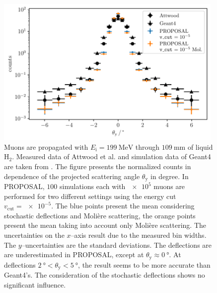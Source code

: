 \documentclass[pdflatex, sn-mathphys]{sn-jnl}%
\theoremstyle{thmstyleone}%
\theoremstyle{thmstyletwo}%
\theoremstyle{thmstylethree}%
\begin{document}
\begin{figure}
    \centering 
    \includegraphics[width=0.98\textwidth]{../../deflection/plots/FINAL/attwood_comparison_moliere_199MeV_final_multi_mean_deg.pdf}
    \caption{
    Muons are 
    propagated with $E_{\mathrm{i}} = \SI{199}{\mega\electronvolt}$ through 
    $\SI{109}{\milli\meter}$ of liquid $\text{H}_2$.
    Measured data of Attwood et al. and simulation data of Geant4 are taken from \cite{attwood_2006}.    
    The figure presents 
    the normalized counts in dependence of the projected scattering angle $\theta_{\mathrm{y}}$ in degree.
    In PROPOSAL, $100$ simulations each with $\num{e5}$ muons are performed for two different settings using the energy cut 
    $v_{\mathrm{cut}} = \num{e-5}$. The blue points present the mean considering stochastic deflections and Molière scattering, the orange points
    present the mean taking into account only Molière scattering.   
    The uncertainties on the $x$--axis result due to the measured bin widths. The $y$--uncertainties are the standard deviations.   
    The deflections are  
    are underestimated in PROPOSAL, except at $\theta_{\mathrm{y}} \approx \SI{0}{\degree}$. At deflections $\SI{2}{\degree} < \theta_{\mathrm{y}} < \SI{5}{\degree}$, 
    the result seems to be more accurate than Geant4's. The consideration of the stochastic deflections shows no significant influence.}
    \label{fig:attwood_comparison}
\end{figure}
\end{document}
